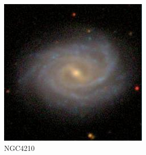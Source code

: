 \documentclass[9pt]{revtex4-1}
\begin{document}
\begin{figure}
\includegraphics[scale=0.3]{NGC4210.png}
\caption{NGC4210}
\end{figure}

\clearpage
\end{document}
